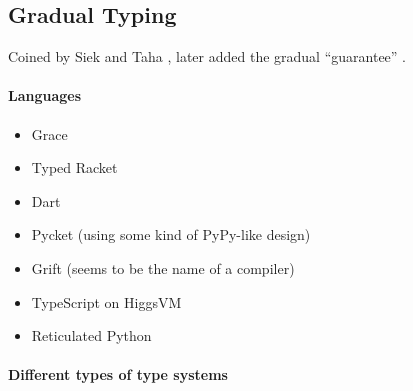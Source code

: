 

\subsection{Gradual Typing}


Coined by Siek and Taha \cite{Siek2006}, later added the gradual ``guarantee'' \cite{Siek2015}.

\paragraph{Languages}


\begin{itemize}
    \item Grace \cite{Boyland2014}
    \item Typed Racket \cite{Takikawa2016}
    \item Dart \cite{Heinze2016, Mezzetti2016}
    \item Pycket (using some kind of PyPy-like design) \cite{Bauman2017}
    \item Grift (seems to be the name of a compiler) \cite{Kuhlenschmidt2018}
    \item TypeScript on HiggsVM \cite{Richards2017}
    \item Reticulated Python \cite{Vitousek2017, Greenman2017}
\end{itemize}

\paragraph{Different types of type systems}


